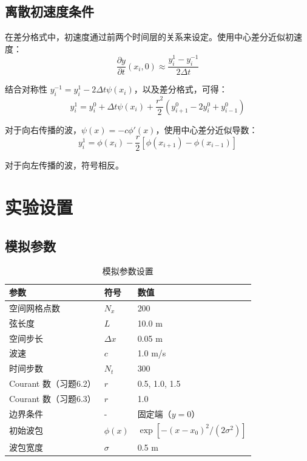\documentclass[12pt,a4paper]{article}
\begin{document}
\subsection{离散初速度条件}

在差分格式中，初速度通过前两个时间层的关系来设定。使用中心差分近似初速度：
\begin{equation}
\frac{\partial y}{\partial t}(x_i, 0) \approx \frac{y_i^1 - y_i^{-1}}{2\Delta t}
\end{equation}

结合对称性 $y_i^{-1} = y_i^1 - 2\Delta t \psi(x_i)$，以及差分格式，可得：
\begin{equation}
y_i^1 = y_i^0 + \Delta t \psi(x_i) + \frac{r^2}{2}(y_{i+1}^0 - 2y_i^0 + y_{i-1}^0)
\end{equation}

对于向右传播的波，$\psi(x) = -c\phi'(x)$，使用中心差分近似导数：
\begin{equation}
y_i^1 = \phi(x_i) - \frac{r}{2}[\phi(x_{i+1}) - \phi(x_{i-1})]
\end{equation}

对于向左传播的波，符号相反。

\section{实验设置}

\subsection{模拟参数}

\begin{table}[H]
\centering
\caption{模拟参数设置}
\begin{tabular}{lll}
\toprule
参数 & 符号 & 数值 \\
\midrule
空间网格点数 & $N_x$ & 200 \\
弦长度 & $L$ & 10.0 m \\
空间步长 & $\Delta x$ & 0.05 m \\
波速 & $c$ & 1.0 m/s \\
时间步数 & $N_t$ & 300 \\
Courant 数（习题6.2） & $r$ & 0.5, 1.0, 1.5 \\
Courant 数（习题6.3） & $r$ & 1.0 \\
边界条件 & - & 固定端（$y=0$） \\
初始波包 & $\phi(x)$ & $\exp[-(x-x_0)^2/(2\sigma^2)]$ \\
波包宽度 & $\sigma$ & 0.5 m \\
\bottomrule
\end{tabular}
\end{table}
\end{document}
